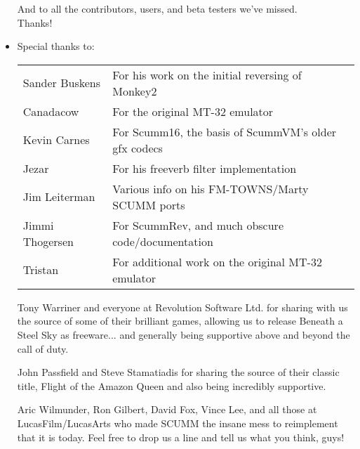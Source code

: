 \begin{itemize}
And to all the contributors, users, and beta testers we've missed.\\
Thanks!
\item Special thanks to:\\
  \begin{tabular}{p{4cm}l}
    Sander Buskens  & For his work on the initial reversing of Monkey2\\
    Canadacow       & For the original MT-32 emulator\\
    Kevin Carnes    & For Scumm16, the basis of ScummVM's older gfx codecs\\
    Jezar           & For his freeverb filter implementation\\
    Jim Leiterman   & Various info on his FM-TOWNS/Marty SCUMM ports\\
    Jimmi Thogersen & For ScummRev, and much obscure code/documentation\\
    Tristan         & For additional work on the original MT-32 emulator\\
  \end{tabular}
  
   Tony Warriner and everyone at Revolution Software Ltd. for sharing
   with us the source of some of their brilliant games, allowing us to
   release Beneath a Steel Sky as freeware... and generally being
   supportive above and beyond the call of duty.

   John Passfield and Steve Stamatiadis for sharing the source of their
   classic title, Flight of the Amazon Queen and also being incredibly
   supportive.

   Aric Wilmunder, Ron Gilbert, David Fox, Vince Lee, and all those at
   LucasFilm/LucasArts who made SCUMM the insane mess to reimplement
   that it is today. Feel free to drop us a line and tell us what you
   think, guys!
\end{itemize}
